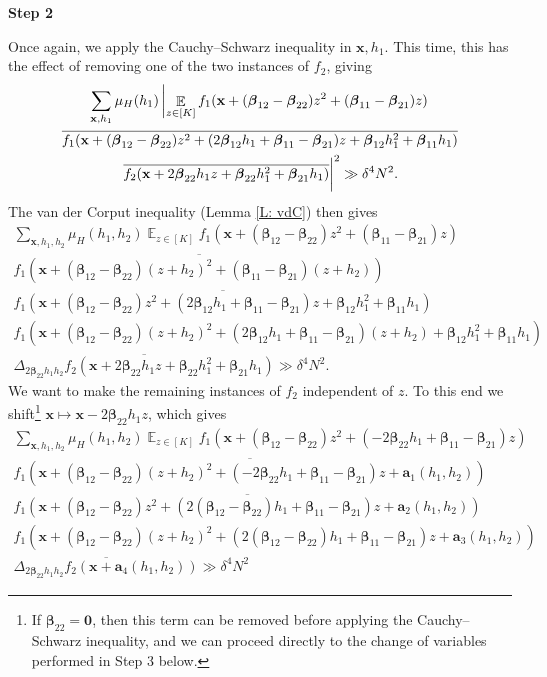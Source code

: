 \documentclass[11pt]{amsart}
\theoremstyle{definition}
\DeclareMathOperator*{\E}{\mathbb{E}}
\newcommand{\ba}{{\textbf{a}}}
\newcommand{\bx}{{\textbf{x}}}
\newcommand{\bbeta}{{\boldsymbol{\beta}}}
\begin{document}
\smallskip
\textbf{Step 2}
\smallskip

Once again, we apply the Cauchy--Schwarz inequality in $\bx, h_1$. This time, this has the effect of removing one of the two instances of $f_2$, giving 
\begin{multline*}
    \sum_{\bx, h_1}\mu_H(h_1)\left|\E_{z\in[K]}f_1(\bx + (\bbeta_{12}-\bbeta_{22})z^2 + (\bbeta_{11}-\bbeta_{21})z)\right.\\
    \overline{f_1(\bx + (\bbeta_{12}-\bbeta_{22})z^2 + (2\bbeta_{12}h_1+\bbeta_{11}-\bbeta_{21} )z + \bbeta_{12}h_1^2+ \bbeta_{11}h_1)}\\
    \left.\overline{f_2(\bx+2\bbeta_{22}h_1z + \bbeta_{22} h_1^2 + \bbeta_{21}h_1)}\vphantom{\E_{z\in[K]}}\right|^2\gg \delta^4 N^2.
\end{multline*}
The van der Corput inequality (Lemma \ref{L: vdC}) then gives
\begin{multline*}
    \sum_{\bx, h_1, h_2}\mu_H(h_1, h_2)\E_{z\in[K]}f_1(\bx + (\bbeta_{12}-\bbeta_{22})z^2 + (\bbeta_{11}-\bbeta_{21})z)\\
    \overline{f_1(\bx + (\bbeta_{12}-\bbeta_{22})(z+h_2)^2 + (\bbeta_{11}-\bbeta_{21})(z+h_2))}\\
    \overline{f_1(\bx + (\bbeta_{12}-\bbeta_{22})z^2 + (2\bbeta_{12}h_1+\bbeta_{11}-\bbeta_{21} )z + \bbeta_{12}h_1^2+ \bbeta_{11}h_1)}\\
    {f_1(\bx + (\bbeta_{12}-\bbeta_{22})(z+h_2)^2 + (2\bbeta_{12}h_1+\bbeta_{11}-\bbeta_{21} )(z+h_2) + \bbeta_{12}h_1^2+ \bbeta_{11}h_1)}\\
    \overline{\Delta_{2\bbeta_{22}h_1 h_2}f_2(\bx+2\bbeta_{22}h_1z + \bbeta_{22} h_1^2 + \bbeta_{21}h_1)}\gg \delta^4 N^2. 
\end{multline*}
We want to make the remaining instances of $f_2$ independent of $z$.  To this end we shift\footnote{If $\bbeta_{22}=\textbf{0}$, then this term can be removed before applying the Cauchy--Schwarz inequality, and we can proceed directly to the change of variables performed in Step 3 below.} $\bx \mapsto \bx - 2\bbeta_{22}h_1 z$, which gives
\begin{multline*}
    \sum_{\bx, h_1, h_2}\mu_H(h_1, h_2)\E_{z\in[K]}f_1(\bx + (\bbeta_{12}-\bbeta_{22})z^2 + (-2\bbeta_{22}h_1+\bbeta_{11}-\bbeta_{21})z)\\
    \overline{f_1(\bx + (\bbeta_{12}-\bbeta_{22})(z+h_2)^2 + (-2\bbeta_{22}h_1+\bbeta_{11}-\bbeta_{21})z + \ba_1(h_1, h_2))}\\
    \overline{f_1(\bx + (\bbeta_{12}-\bbeta_{22})z^2 + (2(\bbeta_{12}-\bbeta_{22})h_1+\bbeta_{11}-\bbeta_{21} )z + \ba_2(h_1,h_2))}\\
    {f_1(\bx + (\bbeta_{12}-\bbeta_{22})(z+h_2)^2 + (2(\bbeta_{12}-\bbeta_{22})h_1+\bbeta_{11}-\bbeta_{21} )z +  \ba_3(h_1,h_2))}\\
    \overline{\Delta_{2\bbeta_{22}h_1 h_2}f_2(\bx+\ba_4(h_1, h_2))}\gg \delta^4 N^2
\end{multline*}
\end{document}
